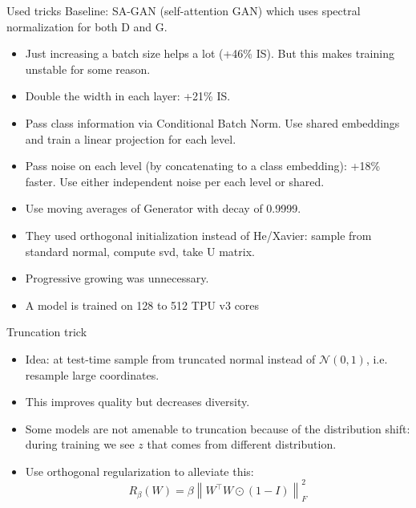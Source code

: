 \documentclass[handout, 10pt]{beamer}
\begin{document}
\begin{frame}{Used tricks}
    \pause 
    Baseline: SA-GAN (self-attention GAN) which uses spectral normalization for both D and G.
    \begin{itemize}
        \item \pause Just increasing a batch size helps a lot (+46\% IS). But this makes training unstable for some reason.
        \item \pause Double the width in each layer: +21\% IS.
        \item \pause Pass class information via Conditional Batch Norm. Use shared embeddings and train a linear projection for each level.
        \item \pause Pass noise on each level (by concatenating to a class embedding): +18\% faster. Use either independent noise per each level or shared.
        \item \pause Use moving averages of Generator with decay of 0.9999.
        \item \pause They used orthogonal initialization instead of He/Xavier: sample from standard normal, compute svd, take U matrix.
        \item \pause Progressive growing was unnecessary.
        \item \pause A model is trained on 128 to 512 TPU v3 cores
    \end{itemize}
\end{frame}

\begin{frame}{Truncation trick}
    \pause 
    
    \begin{itemize}
        \item \pause Idea: at test-time sample from truncated normal instead of $\mathcal{N}(0,1)$, i.e. resample large coordinates.
        \item \pause This improves quality but decreases diversity.
        \item \pause Some models are not amenable to truncation because of the distribution shift: during training we see $z$ that comes from different distribution.
        \item \pause Use orthogonal regularization to alleviate this:
        $$
        R_{\beta}(W)=\beta\left\|W^{\top} W \odot(1-I)\right\|_{F}^{2}
        $$
    \end{itemize}
\end{frame}
\end{document}
